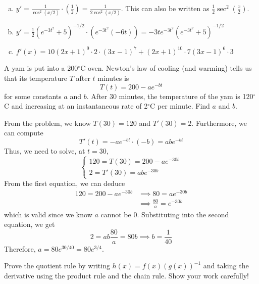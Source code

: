 \documentclass[11pt]{exam}
\begin{document}
\begin{questions}
  \begin{solution}
    \begin{enumerate}[(a)]
    \item \(y' = \frac{1}{\cos^2(x/2)}\cdot \left( \frac{1}{2} \right)
      = \frac{1}{2\cos^2(x/2)}\). This can also be written as \(\frac{1}{2}\sec^2\left( \frac{x}{2} \right)\).
    \item \(y' = \frac{1}{2}\left( e^{-3t^2}+5 \right)^{-1/2}\cdot\left(
        e^{-3t^2}(-6t) \right) = -3te^{-3t^2}\left( e^{-3t^2}+5 \right)^{-1/2}\)
    \item \(f'(x) = 10(2x+1)^9 \cdot 2 \cdot (3x-1)^7 + (2x+1)^{10} \cdot
      7(3x-1)^6 \cdot 3\)
    \end{enumerate}
  \end{solution}
\question A yam is put into a 200$^{\circ}$C oven.  Newton's law of cooling (and warming) tells us that its temperature $T$ after $t$ minutes is
$$T(t) = 200 - ae^{-bt}$$
for some constants $a$ and $b$. After $30$ minutes, the temperature of the yam is 120$^{\circ}$C and increasing at an instantaneous rate of 2$^{\circ}$C per minute.  Find $a$ and $b$. 
\begin{solution}
  From the problem, we know \(T(30) = 120\) and
  \(T'(30)=2\). Furthermore, we can compute \[
    T'(t) = -a e^{-bt} \cdot (-b) = ab e^{-bt}
  \]
  Thus, we need to solve, at \(t=30\), \[
    \begin{cases}
      120 = T(30) = 200-ae^{-30b}\\
      2 = T'(30) = abe^{-30b}
    \end{cases}
  \]
  From the first equation, we can deduce
  \begin{align*}
    120 = 200-ae^{-30b} & \implies 80 = ae^{-30b} \\
    & \implies \frac{80}{a} = e^{-30b}
  \end{align*}
  which is valid since we know \(a\) cannot be \(0\). Substituting
  into the second equation, we get \[
    2 = ab \frac{80}{a} = 80b \implies b = \frac{1}{40}
  \]
  Therefore, \(a = 80 e^{30/40} = 80 e^{3/4}\).
\end{solution}
\question Prove the quotient rule by writing \(h(x) =
  f(x)(g(x))^{-1}\) and taking the derivative using the product rule
  and the chain rule. Show your work carefully!

\end{questions}
\end{document}
